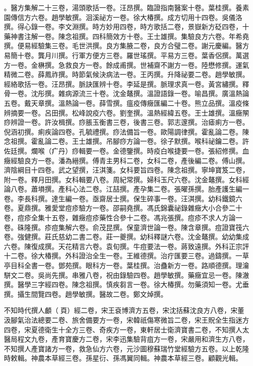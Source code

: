 \begin{pinyinscope}
。醫方集解二十三卷，湯頭歌括一卷。汪昂撰。臨證指南醫案十卷。葉桂撰。養素園傳信方六卷。趙學敏撰。洄溪祕方一卷。徐大椿撰。成方切用十四卷。吳儀洛撰。得心錄一卷。李文淵撰。時方妙用四卷，時方歌括二卷，景嶽新方砭四卷，十藥神書注解一卷。陳念祖撰。四科簡效方十卷。王士雄撰。集驗良方六卷。年希堯撰。便易經驗集三卷。毛世洪撰。良方集腋二卷，良方合璧二卷。謝元慶編。醫方易簡十卷。龔月川撰。行軍方便方三卷。羅世瑤撰。平易方三卷。葉香侶撰。萬選方一卷。金楙撰。急救良方一卷。餘成甫撰。世補齋不謝方一卷。陸懋修撰。運氣精微二卷。薛鳳祚撰。時節氣候決病法一卷。王丙撰。升降祕要二卷。趙學敏撰。經絡歌括一卷。汪昂撰。脈訣匯辨十卷。李延是撰。脈理求真一卷。黃宮繡撰。釋骨一卷。沈彤撰。雜病源流三十卷。沈金鼇撰。溫證語錄一卷。喻昌撰。廣溫熱論五卷。戴天章撰。溫熱論一卷。薛雪撰。瘟疫傳癥匯編二十卷。熊立品撰。溫疫條辨摘要一卷。呂田撰。松峰說疫六卷。劉奎撰。溫熱經緯五卷。王士雄撰。溫癥䦛痧辨證一卷。許汝楫撰。痧脹玉衡書三卷，後書三卷。郭志邃撰。治瘧痢方一卷。倪涵初撰。痢疾論四卷。孔毓禮撰。痧法備旨一卷。歐陽調律撰。霍亂論二卷。陳念祖撰。霍亂論二卷。王士雄撰。吊腳痧方論一卷。徐子默撰。喉科祕鑰二卷。許佐廷撰。爛喉（疒丹）痧輯要一卷。金德鑒撰。時疫白喉捷要一卷。張紹修撰。血癥經驗良方一卷。潘為縉撰。傅青主男科二卷，女科二卷，產後編二卷。傅山撰。濟陰綱目十四卷。武之望撰，汪淇箋。女科要旨四卷。陳念祖撰。寧坤寶笈二卷，附一卷。釋月田撰。女科輯要八卷。周紀常撰。婦科玉尺六卷。沈金鼇撰。女科經論八卷。蕭塤撰。產科心法二卷。江喆撰。產孕集二卷。張曜孫撰。胎產護生編一卷。李長科撰。達生編一卷。亟齋居士撰。保生碎事一卷。汪淇撰。幼科鐵鏡六卷。夏鼎撰。雅愛堂痘疹驗方一卷。邵嗣堯撰。馮氏錦囊祕錄雜癥大小合參二十卷，痘疹全集十五卷，雜癥痘疹藥性合參十二卷。馮兆張撰。痘疹不求人方論一卷。硃隆撰。疹痘集解六卷。俞茂昆撰。保童濟世論一卷。陳含章撰。痘證寶筏六卷。強健撰。莊氏慈幼二書二卷。莊一夔撰。幼科釋謎六卷。沈金鼇撰。幼幼集成六卷。陳復成撰。天花精言六卷。袁旬撰。牛痘要法一卷。蔣致遠撰。外科正宗評十二卷。徐大椿撰。外科證治全生一卷。王維德撰。治疔匯要三卷。過鑄撰。一草亭目科全書一卷。鄧苑撰。眼科方一卷。葉桂撰。治蠱新方一卷。路順德撰。理瀹駢文二卷。吳尚先撰。串雅八卷，祝由錄驗四卷。趙學敏撰。藥癥宜忌一卷。陳澈撰。醫學三字經四卷。陳念祖撰。慎疾芻言一卷。徐大椿撰。勿藥須知一卷。尤垂撰。攝生間覽四卷。趙學敏撰。醫故二卷。鄭文焯撰。

不知時代撰人顱（頁）經二卷，宋王袞博濟方五卷，宋沈括蘇沈良方八卷，宋董汲腳氣治法總要二卷、旅舍備要方一卷，宋韓祇傷寒微旨二卷，宋王貺全生指迷方四卷，宋夏德衛生十全方三卷、奇疾方一卷，東軒居士衛濟寶書二卷，不知撰人太醫局程文九卷，產育寶慶方二卷，宋李迅集驗背疽方一卷，宋嚴用和濟生方八卷，不知撰人產寶諸方一卷，救急仙方六卷，元沙圖穆蘇瑞竹堂經驗方五卷。以上乾隆時敕輯。神農本草經三卷。孫星衍、孫馮翼同輯。神農本草經三卷。顧觀光輯。


\end{pinyinscope}
